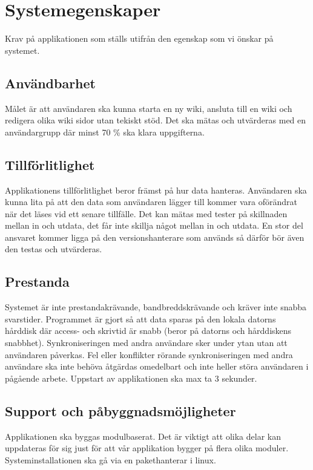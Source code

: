 \section{Systemegenskaper}
Krav på applikationen som ställs utifrån den egenskap som vi önskar på systemet. 

\subsection{Användbarhet}
Målet är att användaren ska kunna starta en ny wiki, ansluta till en wiki och redigera olika wiki sidor utan tekiskt stöd. Det ska mätas och utvärderas med en användargrupp där minst 70 \% ska klara uppgifterna. 

\subsection{Tillförlitlighet} 
Applikationens tillförlitlighet beror främst på hur data hanteras. Användaren ska kunna lita på att den data som användaren lägger till kommer vara oförändrat när det läses vid ett senare tillfälle. Det kan mätas med tester på skillnaden mellan in och utdata, det får inte skillja något mellan in och utdata. En stor del ansvaret kommer ligga på den versionshanterare som används så därför bör även den testas och utvärderas. 

\subsection{Prestanda}
Systemet är inte prestandakrävande, bandbreddskrävande och kräver inte snabba svarstider. Programmet är gjort så att data sparas på den lokala datorns hårddisk där access- och skrivtid är snabb (beror på datorns och hårddiskens snabbhet). Synkroniseringen med andra användare sker under ytan utan att användaren påverkas. Fel eller konflikter rörande synkroniseringen med andra användare ska inte behöva åtgärdas omedelbart och inte heller störa användaren i pågående arbete. Uppstart av applikationen ska max ta 3 sekunder.

\subsection{Support och påbyggnadsmöjligheter} 
Applikationen ska byggas modulbaserat. Det är viktigt att olika delar kan uppdateras för sig just för att vår applikation bygger på flera olika moduler. Systeminstallationen ska gå via en pakethanterar i linux.

